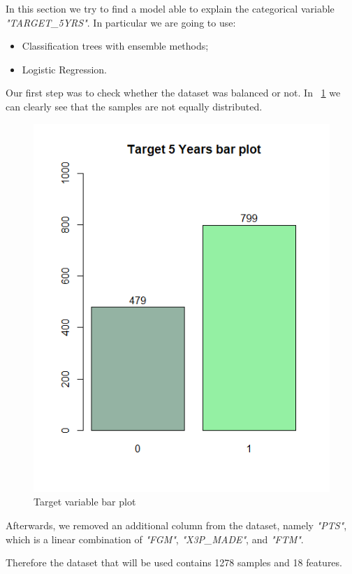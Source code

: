 In this section we try to find a model able to explain the categorical variable \textit{"TARGET\_5YRS"}.
In particular we are going to use:
\begin{itemize}
	\item Classification trees with ensemble methods;
	\item Logistic Regression.
\end{itemize}

Our first step was to check whether the dataset was balanced or not. In \Fig~\ref{fig:target_bar_plot} we can clearly see that the samples are not equally distributed. 

\begin{figure}[h]
	\centering
	\includegraphics[width=0.5\linewidth]{ImageFiles/Classification/target_bar_plot}
	\caption{Target variable bar plot}
	\label{fig:target_bar_plot}
\end{figure}

Afterwards, we removed an additional column from the dataset, namely \textit{"PTS"}, which is a linear combination of \textit{"FGM"}, \textit{"X3P\_MADE"}, and \textit{"FTM"}.

Therefore the dataset that will be used contains 1278 samples and 18 features.
